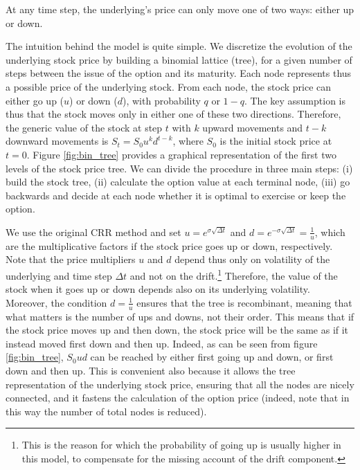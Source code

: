 \begin{assumption}
    \label{ass:bin_9}
    At any time step, the underlying's price can only move one of two ways: either up or down.
\end{assumption}

The intuition behind the model is quite simple. We discretize the evolution of the underlying stock price by building a binomial lattice (tree), for a given number of steps between the issue of the option and its maturity. Each node represents thus a possible price of the underlying stock. From each node, the stock price can either go up ($u$) or down ($d$), with probability $q$ or $1-q$. The key assumption is thus that the stock moves only in either one of these two directions. Therefore, the generic value of the stock at step $t$ with $k$ upward movements and $t-k$ downward movements is $S_t = S_0 u^k d^{t-k}$, where $S_0$ is the initial stock price at $t=0$. Figure \ref*{fig:bin_tree} provides a graphical representation of the first two levels of the stock price tree. 
We can divide the procedure in three main steps: (i) build the stock tree, (ii) calculate the option value at each terminal node, (iii) go backwards and decide at each node whether it is optimal to exercise or keep the option.

We use the original CRR method and set $u = e^{\sigma \sqrt{\Delta t}}$ and $d = e^{-\sigma \sqrt{\Delta t}}=\frac{1}{u}$, which are the multiplicative factors if the stock price goes up or down, respectively. Note that the price multipliers $u$ and $d$ depend thus only on volatility of the underlying and time step $\Delta t$ and not on the drift.\footnote{This is the reason for which the probability of going up is usually higher in this model, to compensate for the missing account of the drift component.} Therefore, the value of the stock when it goes up or down depends also on its underlying volatility. Moreover, the condition $d = \frac{1}{u}$ ensures that the tree is recombinant, meaning that what matters is the number of ups and downs, not their order. This means that if the stock price moves up and then down, the stock price will be the same as if it instead moved first down and then up. Indeed, as can be seen from figure \ref*{fig:bin_tree}, $S_0ud$ can be reached by either first going up and down, or first down and then up. This is convenient also because it allows the tree representation of the underlying stock price, ensuring that all the nodes are nicely connected, and it fastens the calculation of the option price (indeed, note that in this way the number of total nodes is reduced). 

